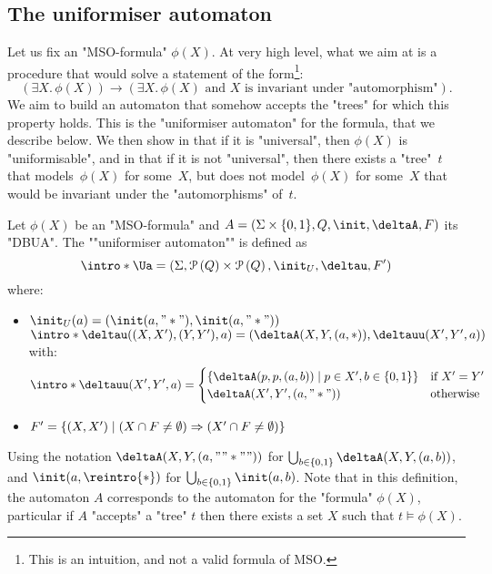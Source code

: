 \documentclass[a4paper,UKenglish,cleveref, autoref, thm-restate]{lipics-v2021}
\begin{document}
\subsection{The uniformiser automaton}\label{section:uniformiser-automaton}
Let us fix an "MSO-formula" $\phi(X)$. At very high level, what we aim at is a procedure that would solve a statement of the form\footnote{This is an intuition, and not a valid formula of MSO.}:
\[
	(\exists X.\, \phi(X)) \rightarrow (\exists X.\, \phi(X) \text{ and $X$ is invariant under "automorphism"}).
\]
We aim to build an automaton that somehow accepts the "trees" for which this property holds.
This is the "uniformiser automaton" for the formula, that we describe below. We then show in  that if it is "universal",
then $\phi(X)$ is "uniformisable", and in  that if it is not "universal", then there exists a
"tree"~$t$ that models~$\phi(X)$ for some~$X$, but does not model~$\phi(X)$ for some~$X$ that would be invariant under the "automorphisms" of~$t$.
\begin{definition}
	\AP Let $\phi(X)$ be an "MSO-formula" and $A = (\Sigma \times \{0,1\}, Q, \init, \deltaA, F)$ its "DBUA". The ""uniformiser automaton"" is defined as
	\[
		\intro* \Ua = (\Sigma, \parts{Q} \times \parts{Q}, \init_U, \deltau, F')
	\]
	where:
	\begin{itemize}
		\item $\init_U(a) = (\init(a,"*"), \init(a,"*"))$
		      \itemAP $\intro*\deltau((X,X'),(Y,Y'),a) = (\deltaA(X,Y,(a,*)), \deltauu(X',Y',a))$ with:
		      \[
			      \intro*\deltauu(X',Y',a) = \begin{cases}
				      \setdef{\deltaA(p,p,(a,b))}{p \in X', b \in \set{0,1}} & \text{if } X' = Y' \\
				      \deltaA(X',Y',(a,"*"))                                 & \text{otherwise}
			      \end{cases}
		      \]
		\item $F' = \left\{(X,X') \mid (X \cap F \neq \emptyset) \Rightarrow (X' \cap F \neq \emptyset)\right\}$
	\end{itemize}
	\AP Using the notation $\deltaA(X,Y,(a,""*""))$ for $\bigcup_{b \in \set{0,1}} \deltaA(X,Y,(a,b))$, and $\init(a,\reintro{*})$ for $\bigcup_{b \in \set{0,1}} \init(a,b)$.
	Note that in this definition, the automaton $A$ corresponds to the automaton for the "formula" $\phi(X)$, particular if $A$ "accepts" a "tree" $t$ then
	there exists a set $X$ such that $t \models \phi(X)$.
\end{definition}
\end{document}
